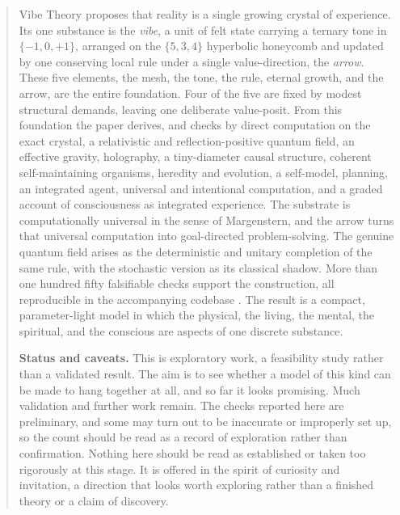 \begin{abstract}
Vibe Theory proposes that reality is a single growing crystal of experience. Its one substance is the
\emph{vibe}, a unit of felt state carrying a ternary tone in $\{-1, 0, +1\}$, arranged on the $\{5,3,4\}$
hyperbolic honeycomb and updated by one conserving local rule under a single value-direction, the
\emph{arrow}. These five elements, the mesh, the tone, the rule, eternal growth, and the arrow, are the
entire foundation. Four of the five are fixed by modest structural demands, leaving one deliberate
value-posit. From this foundation the paper derives, and checks by direct computation on the exact crystal,
a relativistic and reflection-positive quantum field, an effective gravity, holography, a tiny-diameter
causal structure, coherent self-maintaining organisms, heredity and evolution, a self-model, planning, an
integrated agent, universal and intentional computation, and a graded account of consciousness as
integrated experience. The substrate is computationally universal in the sense of Margenstern, and the
arrow turns that universal computation into goal-directed problem-solving. The genuine quantum field arises
as the deterministic and unitary completion of the same rule, with the stochastic version as its classical
shadow. More than one hundred fifty falsifiable checks support the construction, all reproducible in the
accompanying codebase \cite{pollard2026vibetest}. The result is a compact, parameter-light model in which
the physical, the living, the mental, the spiritual, and the conscious are aspects of one discrete substance.

\medskip

\noindent\textbf{Status and caveats.} This is exploratory work, a feasibility study rather than a validated result. The aim is to see whether a model of this kind can be made to hang together at all, and so far it looks promising. Much validation and further work remain. The checks reported here are preliminary, and some may turn out to be inaccurate or improperly set up, so the count should be read as a record of exploration rather than confirmation. Nothing here should be read as established or taken too rigorously at this stage. It is offered in the spirit of curiosity and invitation, a direction that looks worth exploring rather than a finished theory or a claim of discovery.
\end{abstract}
